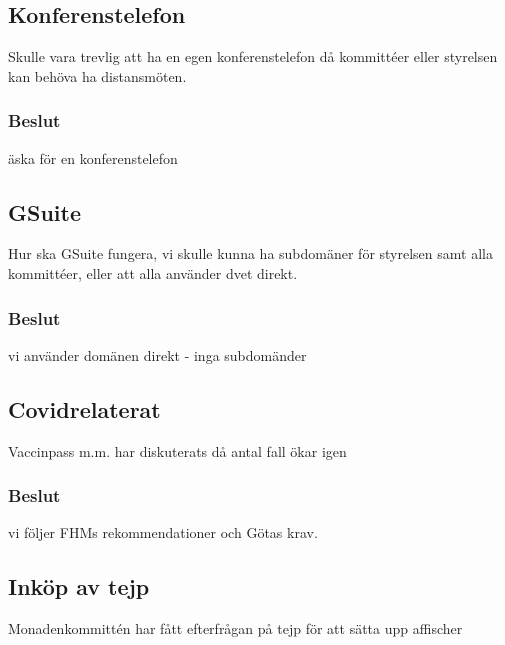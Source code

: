 \documentclass[protokoll]{dvd}
\begin{document}
    \subsection{Konferenstelefon}
        Skulle vara trevlig att ha en egen konferenstelefon då kommittéer eller styrelsen kan behöva ha distansmöten.

        \subsubsection{Beslut}
        \begin{attsatser}
            \item äska för en konferenstelefon
        \end{attsatser}

    \subsection{GSuite}
        Hur ska GSuite fungera, vi skulle kunna ha subdomäner för styrelsen samt alla kommittéer, eller att alla använder dvet direkt.

        \subsubsection{Beslut}
        \begin{attsatser}
            \item vi använder domänen direkt - inga subdomänder
        \end{attsatser}

    \subsection{Covidrelaterat}
        Vaccinpass m.m. har diskuterats då antal fall ökar igen

        \subsubsection{Beslut}
        \begin{attsatser}
            \item vi följer FHMs rekommendationer och Götas krav.
        \end{attsatser}

    \subsection{Inköp av tejp}
        Monadenkommittén har fått efterfrågan på tejp för att sätta upp affischer
\end{document}
